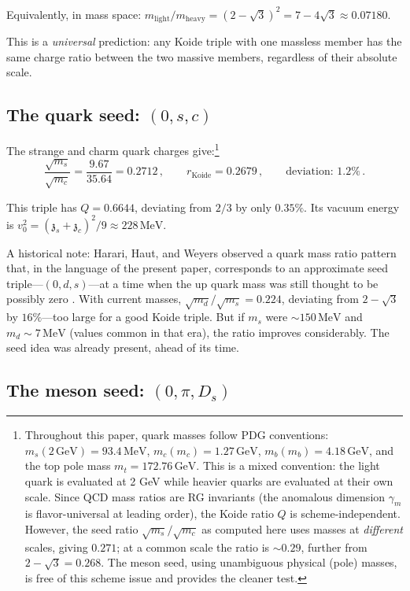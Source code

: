 \documentclass[12pt,a4paper]{article}
\newcommand{\MeV}{\,\text{MeV}}
\newcommand{\GeV}{\,\text{GeV}}
\newcommand{\zch}{\mathfrak{z}}
\begin{document}
Equivalently, in mass space: 
$m_{\text{light}}/m_{\text{heavy}} = (2 - \sqrt{3})^2 = 7 - 4\sqrt{3} 
\approx 0.07180$.

This is a \emph{universal} prediction: any Koide triple with one 
massless member has the same charge ratio between the two massive 
members, regardless of their absolute scale.

\subsection{The quark seed: $(0, s, c)$}

The strange and charm quark charges give:\footnote{Throughout 
this paper, quark masses follow PDG conventions: 
$m_s(2\GeV) = 93.4\MeV$, $m_c(m_c) = 1.27\GeV$, 
$m_b(m_b) = 4.18\GeV$, and the top pole mass 
$m_t = 172.76\GeV$. This is a mixed convention: the light 
quark is evaluated at 2 GeV while heavier quarks are 
evaluated at their own scale. Since QCD mass ratios are 
RG invariants (the anomalous dimension $\gamma_m$ is 
flavor-universal at leading order), the Koide ratio $Q$ is 
scheme-independent. However, the seed ratio 
$\sqrt{m_s}/\sqrt{m_c}$ as computed here uses masses at 
\emph{different} scales, giving $0.271$; at a common scale 
the ratio is $\sim 0.29$, further from $2 - \sqrt{3} = 0.268$. 
The meson seed, using unambiguous physical (pole) masses, 
is free of this scheme issue and provides the cleaner test.}
\begin{equation}
\frac{\sqrt{m_s}}{\sqrt{m_c}} = \frac{9.67}{35.64} = 0.2712\,, 
\qquad r_{\text{Koide}} = 0.2679\,, \qquad \text{deviation: } 1.2\%\,.
\end{equation}

This triple has $Q = 0.6644$, deviating from $2/3$ by only $0.35\%$. 
Its vacuum energy is $v_0^2 = (\zch_s + \zch_c)^2/9 \approx 228\MeV$.

A historical note: Harari, Haut, and Weyers \cite{Harari} observed 
a quark mass ratio pattern that, in the language of the present paper, 
corresponds to an approximate seed triple---$(0, d, s)$---at a time 
when the up quark mass was 
still thought to be possibly zero \cite{Harari}. With current masses, 
$\sqrt{m_d}/\sqrt{m_s} = 0.224$, deviating from $2 - \sqrt{3}$ by 
$16\%$---too large for a good Koide triple. But if $m_s$ were 
$\sim 150\MeV$ and $m_d \sim 7\MeV$ (values common in that era), the 
ratio improves considerably. The seed idea was already present, ahead 
of its time.

\subsection{The meson seed: $(0, \pi, D_s)$}
\end{document}
